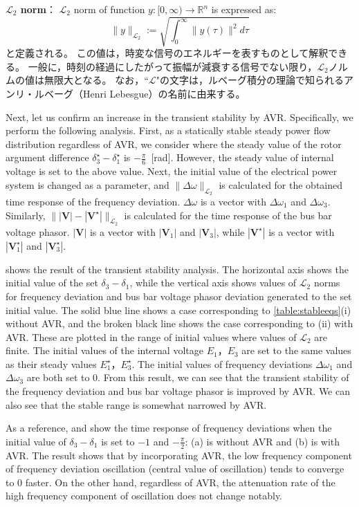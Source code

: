 \documentclass[graybox, envcountchap]{svmult}
\begin{document}
\begin{例}[自動電圧調整器による定態安定性と過渡安定度の変化]
\begin{COLUMN}
\noindent \textbf{$\mathcal{L}_2$ norm}：
$\mathcal{L}_2$ norm of function $y:[0,\infty) \rightarrow \mathbb{R}^n$ is
expressed as:
\[
\|y\|_{\mathcal{L}_2} := \sqrt{
\int^{\infty}_{0}
\| y(\tau)\|^2  d \tau
}
\]
と定義される。
この値は，時変な信号のエネルギーを表すものとして解釈できる。
一般に，時刻の経過にしたがって振幅が減衰する信号でない限り，$\mathcal{L}_2$ノルムの値は無限大となる。
なお，``$\mathcal{L}$"の文字は，ルベーグ積分の理論で知られるアンリ・ルベーグ（Henri Lebesgue）の名前に由来する。
\end{COLUMN}

Next, let us confirm an increase in the transient stability by AVR.
Specifically, we perform the following analysis.
First, as a statically stable steady power flow distribution regardless of AVR, we consider where the steady value of the rotor argument difference $\delta_3^{\star}-\delta_1^{\star}$ is $-\tfrac{\pi}{6}$~[rad].
However, the steady value of internal voltage is set to the above value.
Next, the initial value of the electrical power system is changed as a parameter, and $\|\Delta\omega\|_{\mathcal{L}_2}$ is calculated for the obtained time response of the frequency deviation.
$\Delta \omega$ is a vector with $\Delta \omega_1$ and $\Delta \omega_3$.
Similarly, $\||\bm{V}|-|\bm{V}^{\star}| \|_{\mathcal{L}_2}$ is calculated for the time response of the bus bar voltage phasor.
$|\bm{V}|$ is a vector with $|\bm{V}_1|$ and $|\bm{V}_3|$, while $|\bm{V}^{\star}|$ is a vector with $|\bm{V}_1^{\star}|$ and $|\bm{V}_3^{\star}|$.


 shows the result of the transient stability analysis.
The horizontal axis shows the initial value of the set $\delta_3-\delta_1$, while the vertical axis shows values of $\mathcal{L}_2$ norms for frequency deviation and bus bar voltage phasor deviation generated to the set initial value.
The solid blue line shows a case corresponding to \ref{table:stableeqs}(i) without AVR, and the broken black line shows the case corresponding to (ii) with AVR.
These are plotted in the range of initial values where values of $\mathcal{L}_2$ are finite.
The initial values of the internal voltage $E_1$，$E_3$ are set to the same values as their steady values $E_1^{\star}$，$E_3^{\star}$.
The initial values of frequency deviations $\Delta \omega_1$ and $\Delta \omega_3$ are both set to 0.
From this result, we can see that the transient stability of the frequency deviation and bus bar voltage phasor is improved by AVR.
We can also see that the stable range is somewhat narrowed by AVR.

As a reference,  and  show the time response of frequency deviations when the initial value of $\delta_3-\delta_1$ is set to $-1$ and $-\tfrac{\pi}{2}$: (a) is without AVR and (b) is with AVR.
The result shows that by incorporating AVR, the low frequency component of frequency deviation oscillation (central value of oscillation) tends to converge to 0 faster.
On the other hand, regardless of AVR, the attenuation rate of the high frequency component of oscillation does not change notably.
\end{例}
\end{document}
